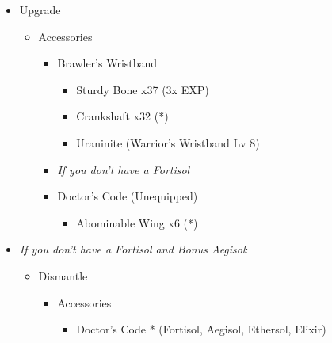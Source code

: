 	\begin{upgrade}
		\begin{itemize}
			\item Upgrade
			      \begin{itemize}
				      \item Accessories
				            \begin{itemize}
					            \item Brawler's Wristband
					                  \begin{itemize}
						                  \item Sturdy Bone x37 (3x EXP)
						                  \item Crankshaft x32 (*)
						                  \item Uraninite (Warrior's Wristband Lv 8)
					                  \end{itemize}
					            \item \textit{If you don't have a Fortisol}
					            \item Doctor's Code (Unequipped)
					                  \begin{itemize}
						                  \item Abominable Wing x6 (*)
					                  \end{itemize}
				            \end{itemize}
			      \end{itemize}
			\item \textit{If you don't have a Fortisol and Bonus Aegisol}:
			      \begin{itemize}
				      \item Dismantle
				            \begin{itemize}
					            \item Accessories
					                  \begin{flushleft}
						                  \begin{itemize}
							                  \item Doctor's Code * (Fortisol, Aegisol, Ethersol, Elixir)
						                  \end{itemize}
					                  \end{flushleft}
				            \end{itemize}
			      \end{itemize}
		\end{itemize}
	\end{upgrade}
	\renewcommand{\first}{[1] Guerilla (\rav/\syn/\sab)}
